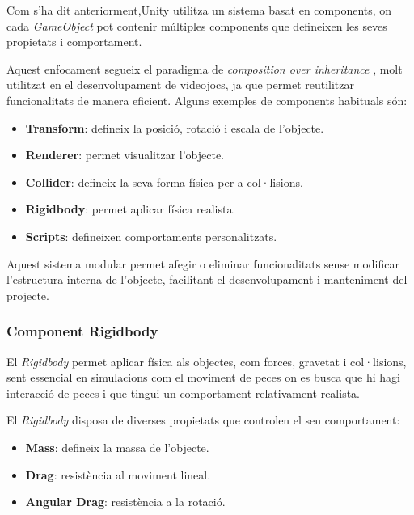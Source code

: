 \documentclass[a4paper,11pt,DIV=13,headings=normal,abstract=true,twoside=semi]{article}
\begin{document}
Com s'ha dit anteriorment,Unity utilitza un sistema basat en components, on cada \textit{GameObject} pot contenir múltiples components que defineixen les seves propietats i comportament.

Aquest enfocament segueix el paradigma de \textit{composition over inheritance} \cite{UnityComponents}, molt utilitzat en el desenvolupament de videojocs, ja que permet reutilitzar funcionalitats de manera eficient. Alguns exemples de components habituals són:

\begin{itemize}
\item \textbf{Transform}: defineix la posició, rotació i escala de l'objecte.
\item \textbf{Renderer}: permet visualitzar l'objecte.
\item \textbf{Collider}: defineix la seva forma física per a col·lisions.
\item \textbf{Rigidbody}: permet aplicar física realista.
\item \textbf{Scripts}: defineixen comportaments personalitzats.
\end{itemize}

Aquest sistema modular permet afegir o eliminar funcionalitats sense modificar l'estructura interna de l'objecte, facilitant el desenvolupament i manteniment del projecte.

\subsubsection{Component Rigidbody}

El \textit{Rigidbody} \cite{UnityRigidbody} permet aplicar física als objectes, com forces, gravetat i col·lisions, sent essencial en simulacions com el moviment de peces on es busca que hi hagi interacció de peces i que tingui un comportament relativament realista.



El \textit{Rigidbody} disposa de diverses propietats que controlen el seu comportament:

\begin{itemize}
\item \textbf{Mass}: defineix la massa de l'objecte.
\item \textbf{Drag}: resistència al moviment lineal.
\item \textbf{Angular Drag}: resistència a la rotació.
\end{itemize}
\end{document}
